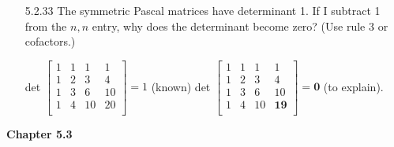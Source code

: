 \documentclass[10pt,twoside,reqno]{article}
\begin{document}
\begin{enumerate}
\vspace{3mm}

\item[5.2.33] The symmetric Pascal matrices have determinant 1. If I subtract 1 from the $n, n$ entry, why does the determinant become zero? (Use rule 3 or cofactors.) \\
\begin{center}
det
$
\begin{bmatrix}
1&1&1&1\\
1&2&3&4\\
1&3&6&10\\
1&4&10&20\\
\end{bmatrix}
=1
$
 (known)
\hspace{12mm}
det
$
\begin{bmatrix}
1&1&1&1\\
1&2&3&4\\
1&3&6&10\\
1&4&10&\textbf{19}\\
\end{bmatrix}
=\textbf{0}
$
 (to explain). \\
\end{center}
\vspace{3mm}



\vspace{3mm}
\end{enumerate}
\vspace{5mm}
\textbf{Chapter 5.3}
\end{document}
